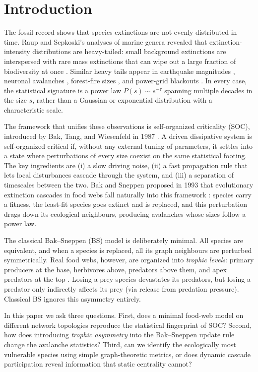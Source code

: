 \documentclass[10pt,a4paper,twocolumn]{article}
\begin{document}
\section{Introduction}
The fossil record shows that species extinctions are not evenly distributed in time. Raup and Sepkoski's analyses of marine genera revealed that extinction-intensity distributions are heavy-tailed: small background extinctions are interspersed with rare mass extinctions that can wipe out a large fraction of biodiversity at once \citep{raup1982mass,sepkoski1993compendium}. Similar heavy tails appear in earthquake magnitudes \citep{gutenberg1944frequency}, neuronal avalanches \citep{beggs2003neuronal}, forest-fire sizes \citep{malamud1998forest}, and power-grid blackouts \citep{carreras2004blackouts}. In every case, the statistical signature is a power law $P(s) \sim s^{-\tau}$ spanning multiple decades in the size $s$, rather than a Gaussian or exponential distribution with a characteristic scale.

The framework that unifies these observations is self-organized criticality (SOC), introduced by Bak, Tang, and Wiesenfeld in 1987 \citep{bak1987self,bak1996how}. A driven dissipative system is self-organized critical if, without any external tuning of parameters, it settles into a state where perturbations of every size coexist on the same statistical footing. The key ingredients are (i) a slow driving noise, (ii) a fast propagation rule that lets local disturbances cascade through the system, and (iii) a separation of timescales between the two. Bak and Sneppen proposed in 1993 that evolutionary extinction cascades in food webs fall naturally into this framework \citep{bak1993punctuated}: species carry a fitness, the least-fit species goes extinct and is replaced, and this perturbation drags down its ecological neighbours, producing avalanches whose sizes follow a power law.

The classical Bak--Sneppen (BS) model is deliberately minimal. All species are equivalent, and when a species is replaced, all its graph neighbours are perturbed symmetrically. Real food webs, however, are organized into \emph{trophic levels}: primary producers at the base, herbivores above, predators above them, and apex predators at the top \citep{dunne2002foodweb}. Losing a prey species devastates its predators, but losing a predator only indirectly affects its prey (via release from predation pressure). Classical BS ignores this asymmetry entirely.

In this paper we ask three questions. First, does a minimal food-web model on different network topologies reproduce the statistical fingerprint of SOC? Second, how does introducing \emph{trophic asymmetry} into the Bak--Sneppen update rule change the avalanche statistics? Third, can we identify the ecologically most vulnerable species using simple graph-theoretic metrics, or does dynamic cascade participation reveal information that static centrality cannot?
\end{document}
